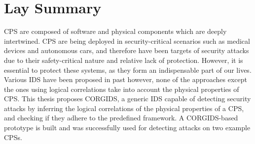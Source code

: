 

\chapter{Lay Summary}

\acf{CPS} are composed of software and physical components which are deeply intertwined.  \ac{CPS} are being deployed in security-critical scenarios such as medical devices and autonomous cars, and therefore have been targets of security attacks due to their safety-critical nature and relative lack of protection. However, it is essential to protect these systems, as they form an indispensable part of our lives. Various \acf{IDS} have been proposed in past however, none of the approaches except the ones using logical correlations take into account the physical properties of \ac{CPS}. This thesis proposes \acf{CORGIDS}, a generic \acf{IDS} capable of detecting security attacks by inferring the logical correlations of the physical properties of a \ac{CPS}, and checking if they adhere to the predefined framework. A \ac{CORGIDS}-based prototype is built and was successfully used for detecting attacks on two example \ac{CPS}s.


